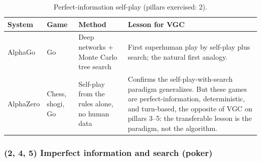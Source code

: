\begin{table}[H]
\small
\tablespacing
\begin{tabularx}{\textwidth}{@{}>{\hsize=0.55\hsize\raggedright\arraybackslash}X
                                >{\hsize=0.55\hsize\raggedright\arraybackslash}X
                                >{\hsize=1.10\hsize\raggedright\arraybackslash}X
                                >{\hsize=1.80\hsize\raggedright\arraybackslash}X@{}}
\toprule
\textbf{System} & \textbf{Game} & \textbf{Method} & \textbf{Lesson for VGC} \\
\midrule
AlphaGo \cite{silver2016alphago}
  & Go
  & Deep networks + Monte Carlo tree search
  & First superhuman play by self-play plus search; the natural first analogy. \\
\addlinespace
AlphaZero \cite{silver2018alphazero}
  & Chess, shogi, Go
  & Self-play from the rules alone, no human data
  & Confirms the self-play-with-search paradigm generalizes. But these games are
    perfect-information, deterministic, and turn-based, the opposite of VGC on
    pillars 3--5: the transferable lesson is the paradigm, not the algorithm. \\
\bottomrule
\end{tabularx}
\caption{Perfect-information self-play (pillars exercised: 2).}
\label{tab:analog_selfplay}
\end{table}

\subsubsection{(2, 4, 5) Imperfect information and search (poker)}
\label{subsubsec:analog_poker}

